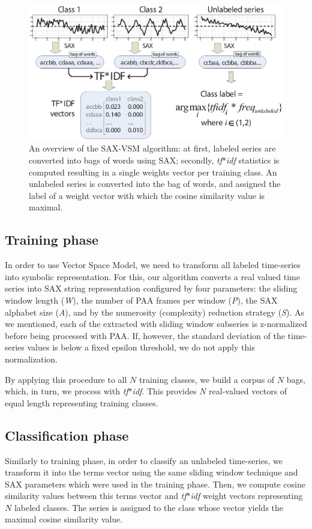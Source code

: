 \documentclass{llncs}
\newcommand{\myfigureshrinker}{\vspace{-1cm}}
\begin{document}
\begin{figure}[t]
   \centering
   \myfigureshrinker
   \includegraphics[width=115mm]{figures/overview.eps}
   \caption{
   An overview of the SAX-VSM algorithm: 
   at first, labeled series are converted into bags of words using SAX; 
   secondly, \textit{tf$\ast$idf} statistics is computed resulting in 
   a single weights vector per training class. An unlabeled series is converted 
   into the bag of words, and assigned the label of a weight vector with which 
   the cosine similarity value is maximal.}
   \label{fig:overview}
\end{figure}

\subsection{Training phase}
In order to use Vector Space Model, we need to transform all labeled time-series into 
symbolic representation.  For this, our algorithm converts a real valued time series 
into SAX string representation configured by four parameters: the sliding window
length (\textit{W}), the number of PAA frames per window (\textit{P}), the SAX alphabet size
(\textit{A}), and by the numerosity (complexity) reduction strategy (\textit{S}). 
As we mentioned, each of the extracted with sliding window subseries is z-normalized
before being processed with PAA.
If, however, 
the standard deviation of the time-series values is below a fixed epsilon threshold, 
we do not apply this normalization.

By applying this procedure to all $N$ training classes, we build a corpus of $N$ bags, 
which, in turn, we process with \textit{tf$\ast$idf}. This provides $N$ real-valued 
vectors of equal length representing training classes. 

\subsection{Classification phase}
Similarly to training phase, in order to classify an unlabeled time-series, we transform it into the
terms vector using the same sliding window technique and SAX parameters which were used 
in the training phase. Then, we compute cosine similarity values between this terms vector and 
\textit{tf$\ast$idf} weight vectors representing $N$ labeled classes. 
The series is assigned to the class whose vector yields the maximal cosine similarity value.
\end{document}
